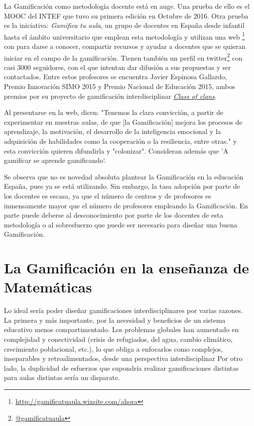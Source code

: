 La Gamificación como metodología docente está en auge. 
%
Una prueba de ello es el \gls{MOOC} del \gls{INTEF} que tuvo su primera edición en Octubre de 2016.
%
Otra prueba es la iniciativa: \textit{Gamifica tu aula}, un grupo de docentes en España desde infantil hasta el ámbito universitario que emplean esta metodología y utilizan una web \footnote{\url{http://gamificatuaula.wixsite.com/ahora}} con para darse a conocer, compartir recursos y ayudar a docentes que se quieran iniciar en el campo de la gamificación.
%
Tienen también un perfil en twitter\footnote{\href{https://twitter.com/gamificatuaula}{@gamificatuaula}} con casi 3000 seguidores, con el que intentan dar difusión a sus propuestas y ser contactados.
%
Entre estos profesores se encuentra Javier Espinosa Gallardo, Premio Innovación SIMO 2015 y Premio Nacional de Educación 2015, ambos premios por su proyecto de gamificación interdisciplinar \href{http://jespinosag.wixsite.com/classofclans}{\textit{Class of clans}}.

Al presentarse en la web, dicen:
%
"Tenemos la clara convicción, a partir de experimentar en nuestras aulas, de que [la Gamificación] mejora los procesos de aprendizaje, la motivación, el desarrollo de la inteligencia emocional y la adquisición de habilidades como la cooperación o la resiliencia, entre otras." 
%
y esta convicción quieren difundirla y "colonizar".
%
Consideran además que ’A gamificar se aprende gamificando‘.

Se observa que no es novedad absoluta plantear la Gamificación en la educación España, pues ya se está utilizando.
%
Sin embargo, la tasa adopción por parte de los docentes es escasa, ya que el número de centros y de profesores es inmensamente mayor que el número de profesores empleando la Gamificación.
%
En parte puede deberse al desconocimiento por parte de los docentes de esta metodología o al sobresfuerzo que puede ser necesario para diseñar una buena Gamificación.

\section{La Gamificación en la enseñanza de Matemáticas}

Lo ideal sería poder diseñar gamificaciones interdisciplinares por varias razones.
%
La primera y más importante, por la necesidad y beneficios de un sistema educativo menos compartimentado. 
%
Los problemas globales han aumentado en complejidad y conectividad (crisis de refugiados, del agua, cambio climático, crecimiento poblacional, etc.), lo que obliga a enfocarlos como complejos, inseparables y retroalimentados, desde una perspectiva interdisciplinar \citep{Interdiscip}
%
Por otro lado, la duplicidad de esfuerzos que supondría realizar gamificaciones distintas para aulas distintas sería un disparate.

